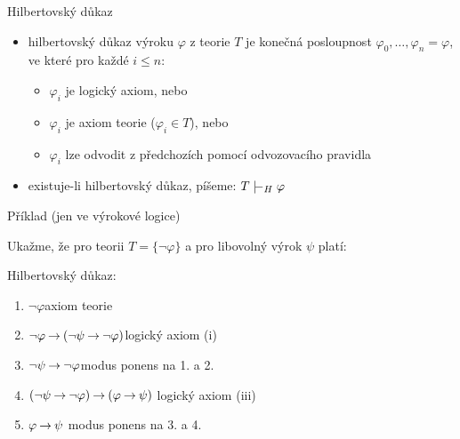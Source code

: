 \documentclass{beamer}
\begin{document}
\begin{frame}{Hilbertovský důkaz}

    \begin{itemize}[<+->]
        \item \alert{hilbertovský důkaz} výroku $\varphi$ z teorie $T$ je \alert{konečná} posloupnost $\varphi_0, \dots, \varphi_n=\varphi$, ve které pro každé $i\le n$:
        \begin{itemize}
        \item $\varphi_i$ je \alert{logický axiom}, nebo
        \item $\varphi_i$ je \alert{axiom teorie} ($\varphi_i \in T$), nebo
        \item $\varphi_i$ lze odvodit z předchozích pomocí \alert{odvozovacího pravidla}
        \end{itemize}
        \item existuje-li hilbertovský důkaz, píšeme: \alert{$T\proves_H\varphi$}
    \end{itemize}

\end{frame}


\begin{frame}{Příklad (jen ve výrokové logice)}

    \pause
    Ukažme, že pro teorii $T=\{\neg\varphi\}$ a pro libovolný výrok $\psi$ platí:  

    \pause
    Hilbertovský důkaz:
    
    \begin{enumerate}\it
        \item $\neg\varphi$\hfill axiom teorie
        \item $\neg \varphi \mathbin{\rightarrow} (\neg \psi \mathbin{\rightarrow} \neg \varphi)$\hfill logický axiom (i)
        \item $\neg \psi \mathbin{\rightarrow} \neg \varphi$\hfill modus ponens na 1. a 2.
        \item $(\neg \psi \mathbin{\rightarrow} \neg \varphi)\mathbin{\rightarrow}(\varphi \mathbin{\rightarrow} \psi)$ \hfill logický axiom (iii)
        \item $\varphi \mathbin{\rightarrow} \psi$ \hfill modus ponens na 3. a 4.
    \end{enumerate}    

\end{frame}
\end{document}
